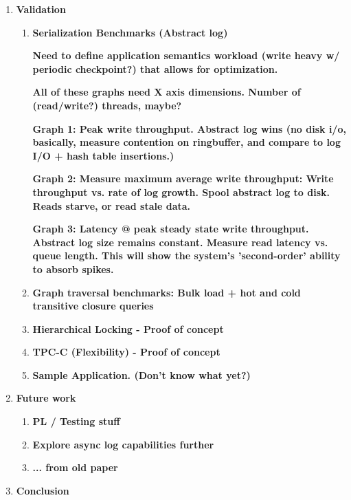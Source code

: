 \documentclass[letterpaper,english]{article}
\begin{document}
\begin{enumerate}
\begin{enumerate}

\end{enumerate}

\item {\bf Validation }

\begin{enumerate}

  \item {\bf Serialization Benchmarks (Abstract log) }

    {\bf Need to define application semantics workload (write heavy w/ periodic checkpoint?) that allows for optimization.}
    
    {\bf All of these graphs need X axis dimensions.  Number of (read/write?) threads, maybe?}
 
    {\bf Graph 1:  Peak write throughput. Abstract log wins (no disk i/o, basically, measure contention on ringbuffer, and compare to log I/O + hash table insertions.)}

    {\bf Graph 2:  Measure maximum average write throughput: Write throughput vs. rate of log growth.  Spool abstract log to disk.
              Reads starve, or read stale data. }

    {\bf Graph 3:  Latency @ peak steady state write throughput.  Abstract log size remains constant.  Measure read latency vs.
               queue length.  This will show the system's 'second-order' ability to absorb spikes. }

  \item {\bf Graph traversal benchmarks:  Bulk load + hot and cold transitive closure queries}

  \item {\bf Hierarchical Locking - Proof of concept}

  \item {\bf TPC-C (Flexibility) - Proof of concept}
    

  \item {\bf Sample Application. (Don't know what yet?) }

\end{enumerate}

\item {\bf Future work}
\begin{enumerate}
  \item {\bf PL / Testing stuff}
  \item {\bf Explore async log capabilities further}
  \item {\bf ... from old paper}
\end{enumerate}
\item {\bf Conclusion}

\end{enumerate}
\end{document}
